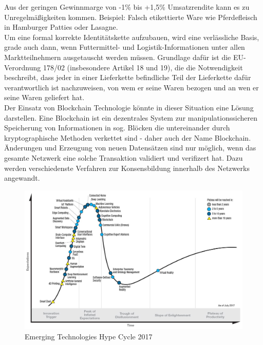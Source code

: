 Aus der geringen Gewinnmarge von -1\% bis +1,5\% Umsatzrendite kann es zu Unregelmäßigkeiten kommen.\cite{CIOWSCE2019}\cite{CIOMuehlenhof2019} Beispiel: Falsch etikettierte Ware wie Pferdefleisch in Hamburger Patties oder Lasagne.\cite[vgl.]{Bundespartei}\\

Um eine formal korrekte Identitätskette aufzubauen, wird eine verlässliche Basis, grade auch dann, wenn Futtermittel- und Logistik-Informationen unter allen Marktteilnehmern ausgetauscht werden müssen. Grundlage dafür ist die EU-Verordnung 178/02 (insbesondere Artikel 18 und 19), die die Notwendigkeit beschreibt, dass jeder in einer Lieferkette befindliche Teil der Lieferkette dafür verantwortlich ist nachzuweisen, von wem er seine Waren bezogen und an wen er seine Waren geliefert hat.\cite[vgl.]{EU2002}\\

Der Einsatz von Blockchain Technologie könnte in dieser Situation eine Lösung darstellen. Eine Blockchain ist ein dezentrales System zur manipulationssicheren Speicherung von Informationen in sog. Blöcken die untereinander durch kryptographische Methoden verkettet sind - daher auch der Name Blockchain. Änderungen und Erzeugung von neuen Datensätzen sind nur möglich, wenn das gesamte Netzwerk eine solche Transaktion validiert und verifizert hat. Dazu werden verschiedenste Verfahren zur Konsensbildung innerhalb des Netzwerks angewandt.\\


\begin{figure}[h!]
	\centering
	\includegraphics[width=0.65\linewidth]{pictures/Gartner-Hype-Cycle-2017}
	\caption[Gartner Hype Cycle 2017]{Emerging Technologies Hype Cycle 2017\cite{Gartner2017}}
	\label{fig:gartner-hype-cycle-2017}
\end{figure}

